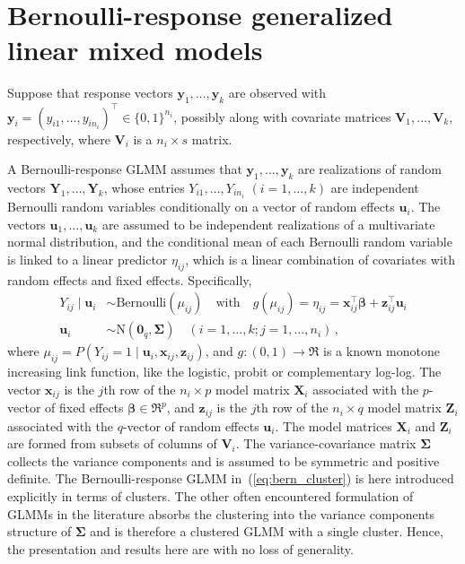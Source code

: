 \documentclass[11pt, a4paper]{article}
\newcommand*{\bb}{\boldsymbol}
\theoremstyle{example} \newtheorem{example}{Example}[section]
\theoremstyle{theorem} \newtheorem{theorem}{Theorem}[section]
\def\bbeta{\bb{\beta}}
\def\bSigma{\bb{\Sigma}}
\def\by{\bb{y}}
\def\bY{\bb{Y}}
\def\bu{\bb{u}}
\def\bx{\bb{x}}
\def\bz{\bb{z}}
\def\b0{\bb{0}}
\def\bX{\bb{X}}
\def\bZ{\bb{Z}}
\def\bV{\bb{V}}
\def\bY{\bb{Y}}
\def\by{\bb{y}}
\begin{document}
\section{Bernoulli-response generalized linear mixed models}
\label{sec:bern_GLMMs}

Suppose that response vectors $\by_1, \ldots, \by_k$ are observed with
$\by_i = (y_{i1}, \ldots, y_{in_i})^\top \in \{0, 1\}^{n_i}$, possibly
along with covariate matrices $\bV_1, \ldots, \bV_k$, respectively,
where $\bV_i$ is a $n_i \times s$ matrix.

A Bernoulli-response GLMM assumes that $\by_1, \ldots, \by_k$
are realizations of random vectors $\bY_1, \ldots, \bY_k$, whose entries
$Y_{i1}, \ldots, Y_{in_i}$ $(i = 1, \ldots, k)$ are independent
Bernoulli random variables conditionally on a vector of random effects
$\bu_i$. The vectors $\bu_1, \ldots, \bu_k$ are assumed to be
independent realizations of a multivariate normal distribution, and the conditional mean of each Bernoulli random
variable is linked to a linear predictor $\eta_{ij}$, which is a
linear combination of covariates with random effects and fixed effects.
Specifically,
\begin{align}
\label{eq:bern_cluster}
  Y_{ij} \mid \bb{u}_i & \sim \text{Bernoulli}(\mu_{ij}) \quad \text{with} \quad
  g(\mu_{ij}) = \eta_{ij} = \bx_{ij}^\top \bbeta + \bz_{ij}^\top \bu_i\\
  \bu_i & \sim \text{N}(\b0_q, \bb{\Sigma})  \quad (i = 1, \ldots, k; j = 1, \ldots, n_i)\,,
\end{align}
where $\mu_{ij} = P(Y_{ij} = 1 \mid \bu_i, \bx_{ij}, \bz_{ij})$, and
$g: (0, 1) \to \Re$ is a known monotone increasing link function, like
the logistic, probit or complementary log-log. The vector $\bx_{ij}$
is the $j$th row of the $n_i \times p$ model matrix $\bX_{i}$
associated with the $p$-vector of fixed effects
$\bbeta \in \Re^p$, and $\bz_{ij}$ is the $j$th row of the
$n_i \times q$ model matrix $\bZ_{i}$ associated with the $q$-vector
of random effects $\bu_i$. The model matrices $\bX_i$ and $\bZ_i$ are
formed from subsets of columns of $\bV_i$. The variance-covariance
matrix $\bSigma$ collects the variance components and is assumed to be
symmetric and positive definite. The Bernoulli-response GLMM
in~(\ref{eq:bern_cluster}) is here introduced explicitly in terms of
clusters. The other often encountered formulation of GLMMs in the literature \citep[Chapter 7.4]{mcculloch+etal:2008} absorbs the clustering into the variance components structure of $\bSigma$ and is therefore a clustered GLMM with a single cluster. Hence, the presentation and results here are with no loss
of generality.
\end{document}
